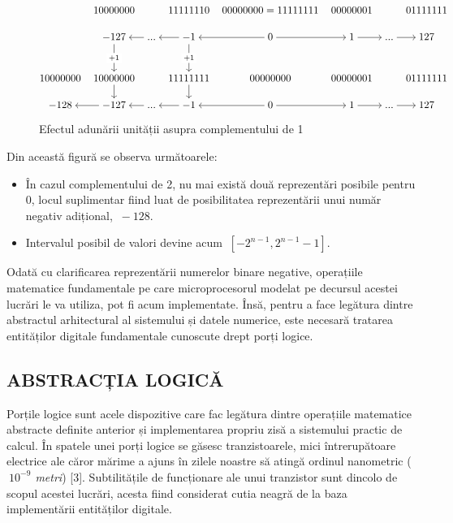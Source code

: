 \documentclass[12pt]{article}
\begin{document}
 \begin{figure}[h!]
 \[\begin{tikzcd}[cramped,column sep=tiny,row sep=scriptsize]
	& 10000000 && 11111110 & {00000000 = 11111111} & 00000001 && 01111111 \\
	& {-127} & {...} & {-1} & 0 & 1 & {...} & 127 \\
	\\
	10000000 & 10000000 && 11111111 & 00000000 & 00000001 && 01111111 \\
	{-128} & {-127} & {...} & {-1} & 0 & 1 & {...} & 127
	\arrow["{+1}"{description}, from=2-2, to=4-2]
	\arrow[from=2-3, to=2-2]
	\arrow[from=2-4, to=2-3]
	\arrow["{+1}"{description}, from=2-4, to=4-4]
	\arrow[from=2-5, to=2-4]
	\arrow[from=2-5, to=2-6]
	\arrow[from=2-6, to=2-7]
	\arrow[from=2-7, to=2-8]
	\arrow[from=4-2, to=5-2]
	\arrow[from=4-4, to=5-4]
	\arrow[from=5-2, to=5-1]
	\arrow[from=5-3, to=5-2]
	\arrow[from=5-4, to=5-3]
	\arrow[from=5-5, to=5-4]
	\arrow[from=5-5, to=5-6]
	\arrow[from=5-6, to=5-7]
	\arrow[from=5-7, to=5-8]
\end{tikzcd}\]
 \centering
 \caption{Efectul adunării unității asupra complementului de 1}
 \label{Figura:3}
\end{figure}

\newpage
Din această figură se observa următoarele:
\begin{itemize}
\item În cazul complementului de 2, nu mai există două reprezentări posibile pentru 0, locul suplimentar fiind luat de posibilitatea reprezentării unui număr negativ adițional, $\ -128$.
\item Intervalul posibil de valori devine acum  $\ [-2^{n-1}, 2^{n-1}-1]$.
\end{itemize}

Odată cu clarificarea reprezentării numerelor binare negative, operațiile matematice fundamentale pe care microprocesorul modelat pe decursul acestei lucrări le va utiliza, pot fi acum implementate. Însă, pentru a face legătura dintre abstractul arhitectural al sistemului și datele numerice, este necesară tratarea entităților digitale fundamentale cunoscute drept porți logice. 

\subsection{ABSTRACȚIA LOGICĂ} 

Porțile logice sunt acele dispozitive care fac legătura dintre operațiile matematice abstracte definite anterior și implementarea propriu zisă a sistemului practic de calcul. În spatele unei porți logice se găsesc tranzistoarele, mici întrerupătoare electrice ale căror mărime a ajuns în zilele noastre să atingă ordinul nanometric (\textit{$\ 10^{-9}$ metri}) [3]. Subtilitățile de  funcționare ale unui tranzistor sunt dincolo de scopul acestei lucrări, acesta fiind considerat cutia neagră de la baza implementării entităților digitale.
\end{document}
